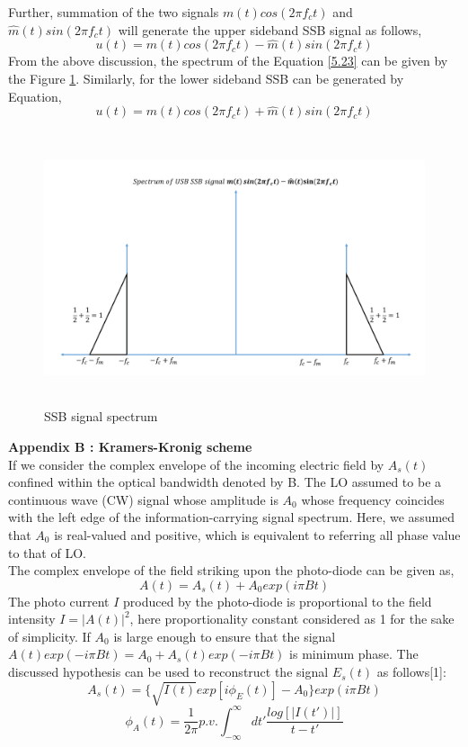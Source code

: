 Further, summation of the two signals ${m(t)} cos(2\pi f_c t)$ and ${\hat{m}(t)} sin(2\pi f_c t)$ will generate the upper sideband SSB signal as follows,
\begin{equation}
u(t)={m(t)} cos(2\pi f_c t)-{\hat{m}(t)} sin(2\pi f_c t)
\label{5.23}
\end{equation}
From the above discussion, the spectrum of the Equation \ref{5.23} can be given by the Figure \ref{SSB_signal_spectrum}. Similarly, for the lower sideband SSB can be generated by Equation,
\begin{equation}
u(t)={m(t)} cos(2\pi f_c t)+{\hat{m}(t)} sin(2\pi f_c t)
\label{5.24}
\end{equation}
\begin{figure}[h]
	\centering
	\includegraphics[width=1.0\textwidth, height=8cm]{./sdf/simplified_coherent_receiver/figures/SSB6.pdf}
	\caption{SSB signal spectrum}\label{SSB_signal_spectrum}
\end{figure}
\textbf{Appendix B : Kramers-Kronig scheme}\\
If we consider the complex envelope of the incoming electric field by $A_s(t)$ confined within the optical bandwidth denoted by B. The LO assumed to be a continuous wave (CW) signal whose amplitude is $A_0$ whose frequency coincides with the left edge of the information-carrying signal spectrum. Here, we assumed that $A_0$ is real-valued and positive, which is equivalent to referring all phase value to that of LO.\\
The complex envelope of the field striking upon the photo-diode can be given as,
\begin{equation}
A(t)=A_s(t)+A_0 exp(i\pi Bt)
\end{equation}
The photo current $I$ produced by the photo-diode is proportional to the field intensity $I=|A(t)|^2$, here proportionality constant considered as 1 for the sake of simplicity. If $A_0$ is large enough to ensure that the signal $A(t)exp(-i\pi Bt)=A_0+A_s(t)exp(-i\pi Bt)$ is minimum phase. The discussed hypothesis can be used to reconstruct the signal $E_s(t)$ as follows[1]:
\begin{equation}
A_s(t)=\{\sqrt{I(t)} exp[i\phi_E(t)]-A_0\} exp(i\pi Bt)
\end{equation}
\begin{equation}
\phi_A(t)=\dfrac{1}{2\pi} p.v. \int_{-\infty}^{\infty} dt' \frac{log[|I(t')|]}{t-t'}
\label{Eq:5.19}
\end{equation}
